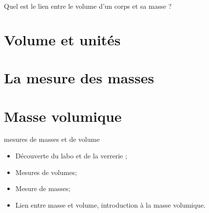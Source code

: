 \documentclass[12pt,a4paper]{article}
\date{}
\title{}
\begin{document}
	
	




\begin{mypb}
	Quel est le lien entre le volume d'un corps et sa masse ?
\end{mypb}


\section{Volume et unités}








\section{La mesure des masses}






\section{Masse volumique}



\begin{myact}{mesures de masses et de volume}
	
	\begin{itemize}
		\item Découverte du labo et de la verrerie ;
		\item Mesures de volumes; 
		\item Mesure de masses;
		\item Lien entre masse et volume, introduction à la masse volumique.
	\end{itemize}
\end{myact}


\end{document}
